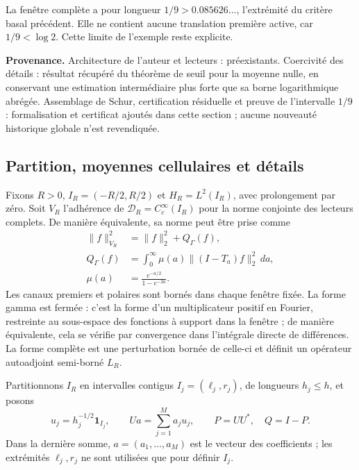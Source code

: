 La fenêtre complète a pour longueur \(1/9>0.085626\ldots\), l'extrémité
du critère basal précédent. Elle ne contient aucune translation première active,
car \(1/9<\log2\). Cette limite de l'exemple reste explicite.

\textbf{Provenance.} Architecture de l'auteur et lecteurs : préexistants. Coercivité
des détails : résultat récupéré du théorème de seuil pour la moyenne nulle, en conservant une estimation
intermédiaire plus forte que sa borne logarithmique abrégée. Assemblage de Schur,
certification résiduelle et preuve de l'intervalle \(1/9\) : formalisation et
certificat ajoutés dans cette section ; aucune nouveauté historique globale n'est revendiquée.

\subsection{Partition, moyennes cellulaires et détails}
\label{schur-add-sub-46}

Fixons \(R>0\), \(I_R=(-R/2,R/2)\) et \(H_R=L^2(I_R)\), avec prolongement par zéro. Soit \(V_R\) l'adhérence de \(\mathcal D_R=C_c^\infty(I_R)\) pour la norme conjointe des lecteurs complets. De manière équivalente, sa norme peut être prise comme
\begin{equation}
\begin{aligned}
\|f\|_{V_R}^2&=\|f\|_2^2+Q_\Gamma(f),\\
Q_\Gamma(f)&=\int_0^\infty\mu(a)\|(I-T_a)f\|_2^2\,da,\\
\mu(a)&=\frac{e^{-a/2}}{1-e^{-2a}}.
\end{aligned}
\label{schur-add-display-2}
\end{equation}
Les canaux premiers et polaires sont bornés dans chaque fenêtre fixée.
La forme gamma est fermée : c'est la forme d'un multiplicateur positif
en Fourier, restreinte au sous-espace des fonctions à support dans la
fenêtre ; de manière équivalente, cela se vérifie par convergence dans l'intégrale
directe de différences. La forme complète est une perturbation bornée
de celle-ci et définit un opérateur autoadjoint semi-borné \(L_R\).

Partitionnons \(I_R\) en intervalles contigus \(I_j=(\ell_j,r_j)\), de longueurs \(h_j\leq h\), et posons
\begin{equation}
u_j=h_j^{-1/2}\mathbf1_{I_j},\qquad
Ua=\sum_{j=1}^M a_j u_j,\qquad P=UU^*,\quad Q=I-P.
\label{schur-add-display-3}
\end{equation}
Dans la dernière somme, \(a=(a_1,\ldots,a_M)\) est le vecteur des coefficients ;
les extrémités \(\ell_j,r_j\) ne sont utilisées que pour définir \(I_j\).

